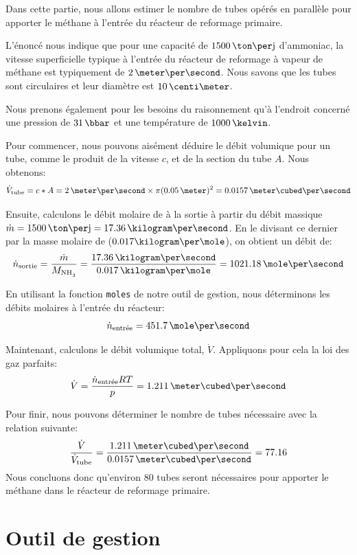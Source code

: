 \documentclass[a4paper,12pt]{article}
\begin{document}
Dans cette partie, nous allons estimer le nombre de tubes opérés
en parallèle pour apporter le méthane à l'entrée du réacteur de reformage primaire.

L’énoncé nous indique que pour une capacité de $1500\,\ton\per\jour$ d’ammoniac,
la vitesse superficielle typique à l’entrée du réacteur de reformage
à vapeur de méthane est typiquement de $2\,\meter\per\second$.
Nous savons que les tubes sont circulaires et leur diamètre est $10\,\centi\meter$.

Nous prenons également pour les besoins du raisonnement qu'à l'endroit concerné
une pression de $31\,\bbar$ et une température de $1000\,\kelvin$.

Pour commencer, nous pouvons aisément déduire le débit volumique pour un tube,
comme le produit de la vitesse $c$, et de la section du tube $A$.
Nous obtenons:
\begin{equation*}
    \dot{V}\ind{tube} = c*A = 2\,\meter\per\second \times \pi(0.05\,\meter)^2
    = 0.0157\,\meter\cubed\per\second
\end{equation*}

Ensuite, calculons le débit molaire de  à la sortie
à partir du débit massique $\dot{m} = 1500\,\ton\per\jour = 17.36\,\kilogram\per\second$.
En le divisant ce dernier par la masse molaire de  ($0.017\kilogram\per\mole$),
on obtient un débit de:
\begin{equation*}
    \dot{n}\ind{sortie} = \frac{\dot{m}}{M_{\ce{NH3}}}
    = \frac{17.36\,\kilogram\per\second}{0.017\,\kilogram\per\mole}
    = 1021.18\,\mole\per\second
\end{equation*}

En utilisant la fonction \texttt{moles} de notre outil de gestion,
nous déterminons les débits molaires à l'entrée du réacteur:
\begin{equation*}
    \dot{n}\ind{entrée} = 451.7\,\mole\per\second
\end{equation*}

Maintenant, calculons le débit volumique total, $\dot{V}$.
Appliquons pour cela la loi des gaz parfaits:
\begin{equation*}
    \dot{V} = \frac{\dot{n}\ind{entrée}RT}{p} = 1.211\,\meter\cubed\per\second
\end{equation*}

Pour finir, nous pouvons déterminer
le nombre de tubes nécessaire avec la relation suivante:
\begin{equation*}
    \frac{\dot{V}}{\dot{V}\ind{tube}}
    = \frac{1.211\,\meter\cubed\per\second}{0.0157\,\meter\cubed\per\second} = 77.16
\end{equation*}
Nous concluons donc qu'environ 80 tubes seront nécessaires pour apporter le méthane
dans le réacteur de reformage primaire.

\section{Outil de gestion}

\printbibliography[heading=bibintoc]
\end{document}
